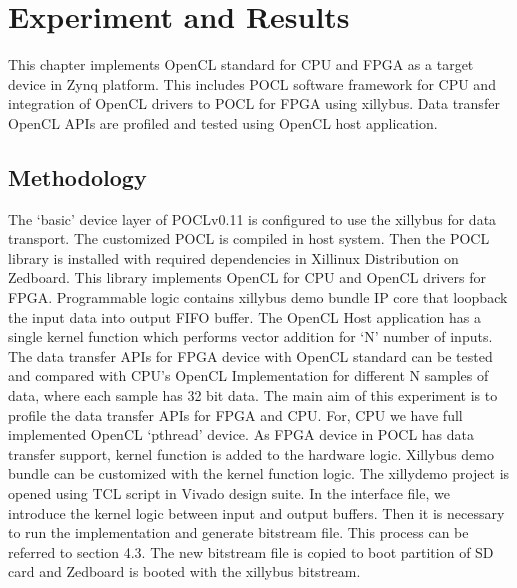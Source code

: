 \chapter{Experiment and Results}
\label{ch5_Experiment_and_Results}

This chapter implements OpenCL standard for CPU and FPGA as a target device in Zynq platform. This includes POCL software framework for CPU and integration of OpenCL drivers to POCL for FPGA using xillybus. Data transfer OpenCL APIs are profiled and tested using OpenCL host application.

\section{Methodology}
The ‘basic’ device layer of POCLv0.11 is configured to use the xillybus for data transport. The customized POCL is compiled in host system. Then the POCL library is installed with required dependencies in Xillinux Distribution on Zedboard. This library implements OpenCL for CPU and OpenCL drivers for FPGA. Programmable logic contains xillybus demo bundle IP core that loopback the input data into output FIFO buffer. The OpenCL Host application has a single kernel function which performs vector addition for ‘N’ number of inputs. The data transfer APIs for FPGA device with OpenCL standard can be tested and compared with CPU’s OpenCL Implementation for different N samples of data, where each sample has 32 bit data.  
The main aim of this experiment is to profile the data transfer APIs for FPGA and CPU. For, CPU we have full implemented OpenCL ‘pthread’ device. As FPGA device in POCL has data transfer support, kernel function is added to the hardware logic. Xillybus demo bundle can be customized with the kernel function logic. The xillydemo project is opened using TCL script in Vivado design suite. In the interface file, we introduce the kernel logic between input and output buffers. Then it is necessary to run the implementation and generate bitstream file. This process can be referred to section 4.3. The new bitstream file is copied to boot partition of SD card and Zedboard is booted with the xillybus bitstream.
 
